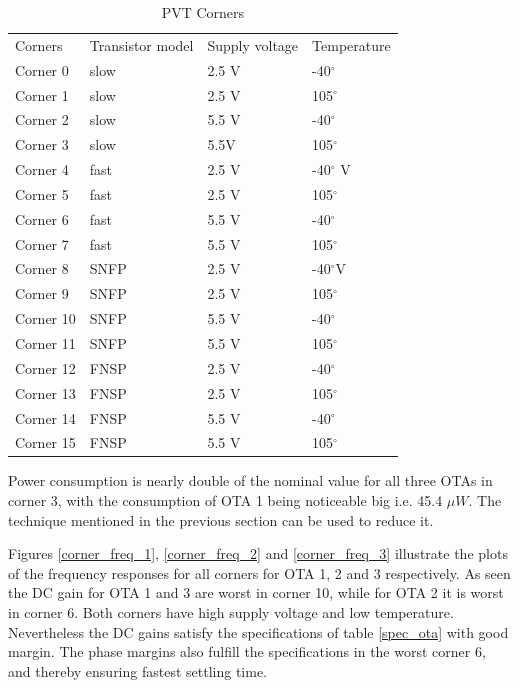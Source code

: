\begin{table}[H]
\centering
\caption{PVT Corners}
\label{corners}
\begin{tabular}{l|l|l|l}
\hline
\multirow{1}{*}{Corners} & \multicolumn{1}{c|}{Transistor model} & \multicolumn{1}{c|}{Supply voltage} & \multicolumn{1}{c}{Temperature} \\\cline{1-4}
                       
            Corner 0       & slow & 2.5 V & -40$^\circ$\\
            Corner 1      & slow & 2.5 V & 105$^\circ$\\
            Corner 2      & slow & 5.5 V & -40$^\circ$\\
            Corner 3      & slow & 5.5V & 105$^\circ$\\
            Corner 4      & fast & 2.5 V & -40$^\circ$ V\\
            Corner 5      & fast & 2.5 V & 105$^\circ$\\
            Corner 6      & fast & 5.5 V &-40$^\circ$\\
            Corner 7      & fast & 5.5 V & 105$^\circ$\\
            Corner 8      & SNFP & 2.5 V & -40$^\circ$V\\
            Corner 9      & SNFP & 2.5 V & 105$^\circ$\\
            Corner 10      & SNFP & 5.5 V & -40$^\circ$\\
            Corner 11      & SNFP & 5.5 V & 105$^\circ$\\
            Corner 12      & FNSP & 2.5 V& -40$^\circ$\\
            Corner 13      & FNSP & 2.5 V & 105$^\circ$\\
            Corner 14      & FNSP & 5.5 V & -40$^\circ$\\
            Corner 15      & FNSP & 5.5 V & 105$^\circ$\\
            
\hline            
\end{tabular}
\end{table}

Power consumption is nearly double of the nominal value for all three OTAs in corner 3, with the consumption of OTA 1 being noticeable big i.e. 45.4 $\mu W$. The technique mentioned in the previous section can be used to reduce it.   

Figures \ref{corner_freq_1}, \ref{corner_freq_2} and \ref{corner_freq_3} illustrate the plots of the frequency responses for all corners for OTA 1, 2 and 3 respectively. As seen the DC gain for OTA 1 and 3 are worst in corner 10, while for OTA 2 it is worst in corner 6. Both corners have high supply voltage and low temperature. Nevertheless the DC gains satisfy the specifications of table \ref{spec_ota} with good margin. The phase margins also fulfill the specifications in the worst corner 6, and thereby ensuring fastest settling time.  

